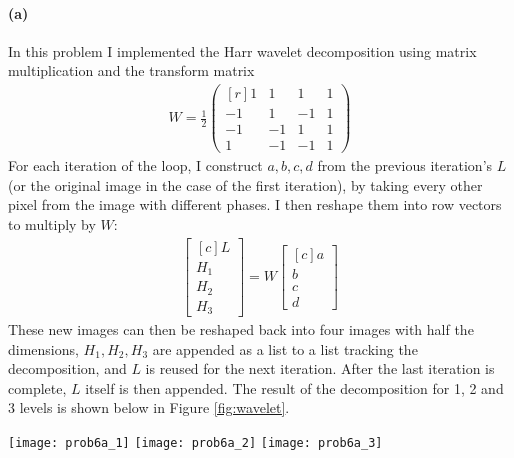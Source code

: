 \documentclass{article}
\newcommand{\spart}[1]{\paragraph{(#1)}}
\begin{document}
\spart{a} In this problem I implemented the Harr wavelet decomposition using matrix multiplication and the transform matrix 
\begin{align}
	W = \frac{1}{2}\begin{pmatrix*}[r]
	    1 & 1 & 1 & 1 \\
	   -1 & 1 &-1 & 1 \\
	   -1 &-1 & 1 & 1 \\
	    1 &-1 &-1 & 1
	\end{pmatrix*}
\end{align}
For each iteration of the loop, I construct $a,b,c,d$ from the previous iteration's $L$ (or the original image in the case of the first iteration), by taking every other pixel from the image with different phases. I then reshape them into row vectors to multiply by $W$:
\begin{align}
	\begin{bmatrix*}[c]
		L \\ H_1 \\ H_2 \\ H_3
	\end{bmatrix*} = W \begin{bmatrix*}[c]
	a \\ b \\ c \\ d
\end{bmatrix*}
\end{align}
These new images can then be reshaped back into four images with half the dimensions, $H_1,H_2,H_3$ are appended as a list to a list tracking the decomposition, and $L$ is reused for the next iteration. After the last iteration is complete, $L$ itself is then appended. The result of the decomposition for 1, 2 and 3 levels is shown below in Figure \ref{fig:wavelet}.

\begin{figure*}[!h]
	\centering
	\texttt{[image: prob6a\_1]}
	\texttt{[image: prob6a\_2]}
	\texttt{[image: prob6a\_3]}
	\caption{Harr Wavelet Decomposition at 1, 2 and 3 Levels (from left to right)}
	\label{fig:wavelet}
\end{figure*}
\end{document}
